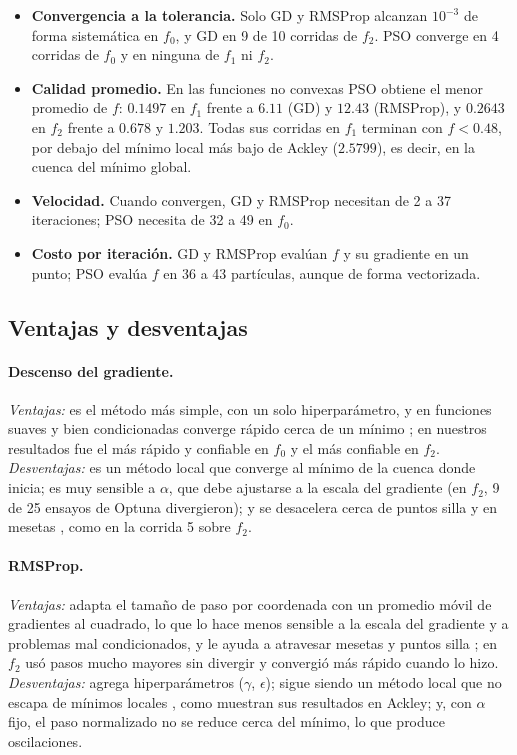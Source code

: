 \begin{itemize}
    \item \textbf{Convergencia a la tolerancia.} Solo GD y RMSProp alcanzan
    $10^{-3}$ de forma sistemática en $f_0$, y GD en 9 de 10 corridas de
    $f_2$. PSO converge en 4 corridas de $f_0$ y en ninguna de $f_1$ ni
    $f_2$.
    \item \textbf{Calidad promedio.} En las funciones no convexas PSO obtiene
    el menor promedio de $f$: $0.1497$ en $f_1$ frente a $6.11$ (GD) y
    $12.43$ (RMSProp), y $0.2643$ en $f_2$ frente a $0.678$ y $1.203$. Todas
    sus corridas en $f_1$ terminan con $f<0.48$, por debajo del mínimo
    local más bajo de Ackley ($2.5799$), es decir, en la cuenca del mínimo
    global.
    \item \textbf{Velocidad.} Cuando convergen, GD y RMSProp necesitan de 2
    a 37 iteraciones; PSO necesita de 32 a 49 en $f_0$.
    \item \textbf{Costo por iteración.} GD y RMSProp evalúan $f$ y su
    gradiente en un punto; PSO evalúa $f$ en 36 a 43 partículas, aunque de
    forma vectorizada.
\end{itemize}

\subsection{Ventajas y desventajas}

\paragraph{Descenso del gradiente.}
\emph{Ventajas:} es el método más simple, con un solo hiperparámetro, y en
funciones suaves y bien condicionadas converge rápido cerca de un mínimo
\cite{nocedal2006numerical}; en nuestros resultados fue el más rápido y
confiable en $f_0$ y el más confiable en $f_2$. \emph{Desventajas:} es un
método local que converge al mínimo de la cuenca donde inicia; es muy
sensible a $\alpha$, que debe ajustarse a la escala del gradiente (en $f_2$,
9 de 25 ensayos de Optuna divergieron); y se desacelera cerca de puntos
silla y en mesetas \cite{goodfellow2016deep,dauphin2014identifying}, como
en la corrida 5 sobre $f_2$.

\paragraph{RMSProp.}
\emph{Ventajas:} adapta el tamaño de paso por coordenada con un promedio
móvil de gradientes al cuadrado, lo que lo hace menos sensible a la escala
del gradiente y a problemas mal condicionados, y le ayuda a atravesar
mesetas y puntos silla \cite{tieleman2012rmsprop,ruder2016overview}; en
$f_2$ usó pasos mucho mayores sin divergir y convergió más rápido cuando lo
hizo. \emph{Desventajas:} agrega hiperparámetros ($\gamma$, $\epsilon$);
sigue siendo un método local que no escapa de mínimos locales
\cite{goodfellow2016deep}, como muestran sus resultados en Ackley; y, con
$\alpha$ fijo, el paso normalizado no se reduce cerca del mínimo, lo que
produce oscilaciones.

